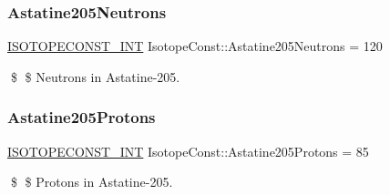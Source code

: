 \subsubsection{\texorpdfstring{Astatine205\+Neutrons}{Astatine205Neutrons}}
{\footnotesize\ttfamily \mbox{\hyperlink{group___isotope_const-_macros_ga5f18360b3e99483a35c32d789e62621c}{I\+S\+O\+T\+O\+P\+E\+C\+O\+N\+S\+T\+\_\+\+I\+NT}} Isotope\+Const\+::\+Astatine205\+Neutrons = 120}

\$ \$ Neutrons in Astatine-\/205. \mbox{\label{group___isotope_const-_astatine-_at205_ga64d549232415c7919c91b1e51fb6ebaa}} 
\subsubsection{\texorpdfstring{Astatine205\+Protons}{Astatine205Protons}}
{\footnotesize\ttfamily \mbox{\hyperlink{group___isotope_const-_macros_ga5f18360b3e99483a35c32d789e62621c}{I\+S\+O\+T\+O\+P\+E\+C\+O\+N\+S\+T\+\_\+\+I\+NT}} Isotope\+Const\+::\+Astatine205\+Protons = 85}

\$ \$ Protons in Astatine-\/205. 